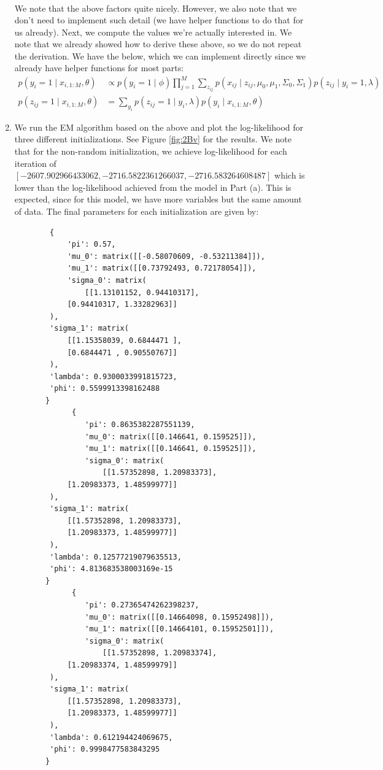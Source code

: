 \documentclass[12pt]{article}
\begin{document}
\begin{enumerate}[label=(\Alph*)]
\begin{align*}
  	\end{align*}
  	We note that the above factors quite nicely. However, we also note that we don't need to implement such detail (we have helper functions to do that for us already). Next, we compute the values we're actually interested in. We note that we already showed how to derive these above, so we do not repeat the derivation. We have the below, which we can implement directly since we already have helper functions for most parts:
  	\begin{align*}
  		p(y_i = 1 \mid x_{i, 1:M}, \theta) &\propto p(y_i = 1\mid \phi) \prod_{j=1}^M\sum_{z_{ij}}p(x_{ij} \mid z_{ij}, \mu_0, \mu_1, \Sigma_0, \Sigma_1)p(z_{ij} \mid y_i = 1, \lambda) \\
  		p(z_{ij} = 1 \mid x_{i, 1:M}, \theta) &= \sum_{y_i}p(z_{ij} = 1 \mid y_i, \lambda)p(y_i \mid x_{i, 1:M}, \theta)
  	\end{align*}
  	\item We run the EM algorithm based on the above and plot the log-likelihood for three different initializations. See Figure \ref{fig:2Bv} for the results. We note that for the non-random initialization, we achieve log-likelihood for each iteration of $[-2607.902966433062, -2716.5822361266037, -2716.583264608487]$ which is lower than the log-likelihood achieved from the model in Part (a). This is expected, since for this model, we have more variables but the same amount of data. The final parameters for each initialization are given by:
  	\begin{verbatim}
  		{
  			'pi': 0.57,
  			'mu_0': matrix([[-0.58070609, -0.53211384]]),
  			'mu_1': matrix([[0.73792493, 0.72178054]]),
  			'sigma_0': matrix(
  				[[1.13101152, 0.94410317],
        	[0.94410317, 1.33282963]]
        ),
        'sigma_1': matrix(
        	[[1.15358039, 0.6844471 ],
        	[0.6844471 , 0.90550767]]
        ),
        'lambda': 0.9300033991815723,
        'phi': 0.5599913398162488
       }
			 {
			 	'pi': 0.8635382287551139,
			 	'mu_0': matrix([[0.146641, 0.159525]]),
			 	'mu_1': matrix([[0.146641, 0.159525]]),
			 	'sigma_0': matrix(
			 		[[1.57352898, 1.20983373],
        	[1.20983373, 1.48599977]]
        ),
        'sigma_1': matrix(
        	[[1.57352898, 1.20983373],
        	[1.20983373, 1.48599977]]
        ),
        'lambda': 0.12577219079635513,
        'phi': 4.813683538003169e-15
       }
			 {
			 	'pi': 0.27365474262398237,
			 	'mu_0': matrix([[0.14664098, 0.15952498]]),
			 	'mu_1': matrix([[0.14664101, 0.15952501]]),
			 	'sigma_0': matrix(
			 		[[1.57352898, 1.20983374],
        	[1.20983374, 1.48599979]]
        ),
        'sigma_1': matrix(
        	[[1.57352898, 1.20983373],
        	[1.20983373, 1.48599977]]
        ),
        'lambda': 0.612194424069675,
        'phi': 0.9998477583843295
       }


\end{verbatim}
\end{enumerate}
\end{document}
